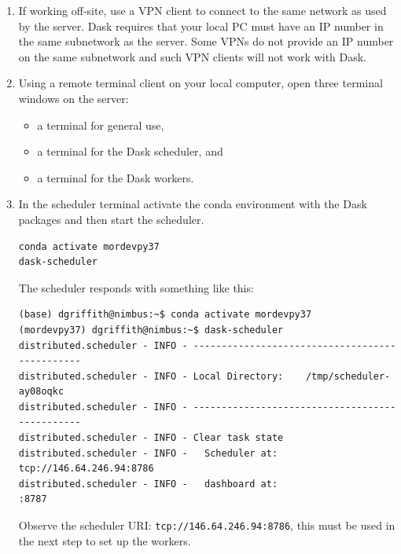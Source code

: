 \begin{enumerate}
\item If working off-site, use a \ac{VPN} client to connect to the same network as used by the server.  Dask requires that your local PC must have an IP number in the same subnetwork as the server.  Some VPNs do not provide an IP number on the same subnetwork and such VPN clients will not work with Dask.
\item Using a remote terminal client on your local computer, open three terminal windows on the server:

\begin{itemize}
\item a  terminal for general use,
\item a terminal for the Dask scheduler, and
\item a terminal for the Dask workers.
\end{itemize}
\item In the scheduler terminal activate the conda environment with the Dask packages and then start the scheduler.

\begin{lstlisting}
conda activate mordevpy37
dask-scheduler
\end{lstlisting}
The scheduler responds with something like this:
\begin{lstlisting}[style=tinysize]
(base) dgriffith@nimbus:~$ conda activate mordevpy37        
(mordevpy37) dgriffith@nimbus:~$ dask-scheduler
distributed.scheduler - INFO - -----------------------------------------------
distributed.scheduler - INFO - Local Directory:    /tmp/scheduler-ay08oqkc
distributed.scheduler - INFO - -----------------------------------------------
distributed.scheduler - INFO - Clear task state
distributed.scheduler - INFO -   Scheduler at:  tcp://146.64.246.94:8786
distributed.scheduler - INFO -   dashboard at:                     :8787
\end{lstlisting}
   
Observe the scheduler URI: \lstinline{tcp://146.64.246.94:8786}, this must be used in the next step to set up the workers.


\end{enumerate}
